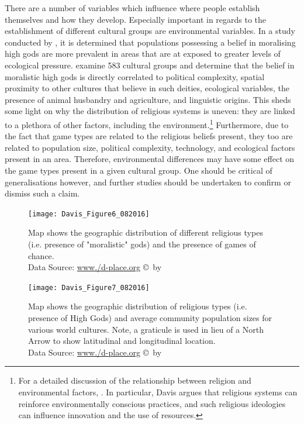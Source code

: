 \documentclass[%
	]{ijsra}
\begin{document}
There are a number of variables which influence where people establish themselves and how they develop. Especially important in regards to the establishment of different cultural groups are environmental variables. In a study conducted by \textcite{botero2014}, it is determined that populations possessing a belief in moralising high gods are more prevalent in areas that are at exposed to greater levels of ecological pressure. \textcite[16786]{botero2014} examine 583 cultural groups and determine that the belief in moralistic high gods is directly correlated to political complexity, spatial proximity to other cultures that believe in such deities, ecological variables, the presence of animal husbandry and agriculture, and linguistic origins. This sheds some light on why the distribution of religious systems is uneven: they are linked to a plethora of other factors, including the environment.\footnote{For a detailed discussion of the relationship between religion and environmental factors, \textcite{davis}. In particular, Davis argues that religious systems can reinforce environmentally conscious practices, and such religious ideologies can influence innovation and the use of resources.} Furthermore, due to the fact that game types are related to the religious beliefs present, they too are related to population size, political complexity, technology, and ecological factors present in an area. Therefore, environmental differences may have some effect on the game types present in a given cultural group. One should be critical of generalisations however, and further studies should be undertaken to confirm or dismiss such a claim.

\begin{figure}[!htb] %
	\texttt{[image: Davis\_Figure6\_082016]}
	\caption{Map shows the geographic distribution of different religious types (i.e. presence of "moralistic" gods) and the presence of games of chance.
	{\normalfont\scriptsize \\ Data Source: \href{http:/www./d-place.org}{www./d-place.org} \copyright\ by 
                 \shortauthor
                  }}
	\label{fig:Figure6_Davis_082016}
\end{figure}

\begin{figure}[!htb] %
	\texttt{[image: Davis\_Figure7\_082016]}
	\caption{Map shows the geographic distribution of religious types (i.e. presence of High Gods) and average community population sizes for various world cultures. Note, a graticule is used in lieu of a North Arrow to show latitudinal and longitudinal location.
	{\normalfont\scriptsize \\ Data Source: \href{http:/www./d-place.org}{www./d-place.org} \copyright\ by 
                 \shortauthor
                  }}
	\label{fig:Figure7_Davis_082016}
\end{figure}
\end{document}
